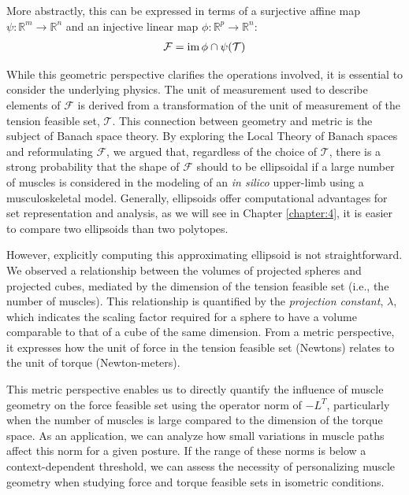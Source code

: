 More abstractly, this can be expressed in terms of a surjective affine map $\psi: \mathbb{R}^m \rightarrow \mathbb{R}^n$ and an injective linear map $\phi: \mathbb{R}^p \rightarrow \mathbb{R}^n$:
\begin{align*}
\mathcal{F} = \operatorname{im} \phi \cap \psi(\mathcal{T})
\end{align*}

While this geometric perspective clarifies the operations involved, it is essential to consider the underlying physics. The unit of measurement used to describe elements of $\mathcal{F}$ is derived from a transformation of the unit of measurement of the tension feasible set, $\mathcal{T}$. This connection between geometry and metric is the subject of Banach space theory. By exploring the Local Theory of Banach spaces and reformulating $\mathcal{F}$, we argued that, regardless of the choice of $\mathcal{T}$, there is a strong probability that the shape of $\mathcal{F}$ should to be ellipsoidal if a large number of muscles is considered in the modeling of an \emph{in silico} upper-limb using a musculoskeletal model. Generally, ellipsoids offer computational advantages for set representation and analysis, as we will see in Chapter \ref{chapter:4}, it is easier to compare two ellipsoids than two polytopes.

However, explicitly computing this approximating ellipsoid is not straightforward. We observed a relationship between the volumes of projected spheres and projected cubes, mediated by the dimension of the tension feasible set (i.e., the number of muscles). This relationship is quantified by the \emph{projection constant}, $\lambda$, which indicates the scaling factor required for a sphere to have a volume comparable to that of a cube of the same dimension. From a metric perspective, it expresses how the unit of force in the tension feasible set (Newtons) relates to the unit of torque (Newton-meters).

This metric perspective enables us to directly quantify the influence of muscle geometry on the force feasible set using the operator norm of $-L^T$, particularly when the number of muscles is large compared to the dimension of the torque space. As an application, we can analyze how small variations in muscle paths affect this norm for a given posture. If the range of these norms is below a context-dependent threshold, we can assess the necessity of personalizing muscle geometry when studying force and torque feasible sets in isometric conditions.

